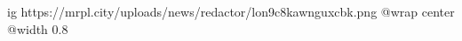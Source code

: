  
 
 
 
 

\ifcmt
  ig https://mrpl.city/uploads/news/redactor/lon9c8kawnguxcbk.png
  @wrap center
  @width 0.8
\fi

